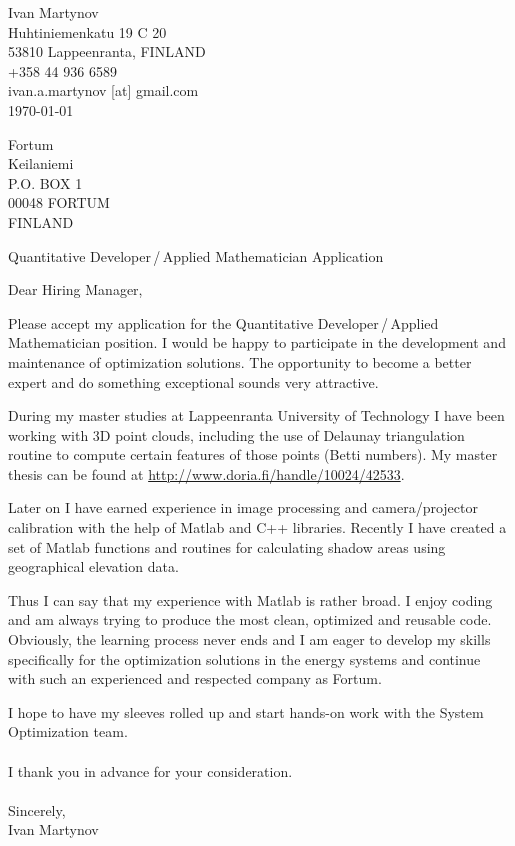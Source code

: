 \documentclass[]{article}
\begin{document}
\begin{flushright}
	Ivan Martynov\\
  Huhtiniemenkatu 19 C 20\\
	53810 Lappeenranta, FINLAND\\
	+358 44 936 6589\\
	ivan.a.martynov [at] gmail.com\\
	\today
\end{flushright}

\begin{flushleft}
  Fortum\\
  Keilaniemi\\
  P.O. BOX 1\\
  00048 FORTUM\\
  FINLAND
\end{flushleft}

\begin{center}
  Quantitative Developer\,/\,Applied Mathematician Application
\end{center}

\noindent
Dear Hiring Manager,
\bigskip

\noindent
Please accept my application for the Quantitative Developer\,/\,Applied
Mathematician position. I would be happy to participate in the development and
maintenance of optimization solutions. The opportunity to become a better expert
and do something exceptional sounds very attractive.

\medskip
\noindent
During my master studies at Lappeenranta University of Technology I have been
working with 3D point clouds, including the use of Delaunay triangulation
routine to compute certain features of those points (Betti numbers). My master
thesis can be found at \href{http://www.doria.fi/handle/10024/42533}
{http://www.doria.fi/handle/10024/42533}.

\medskip
\noindent
Later on I have earned experience in image processing and camera/projector
calibration with the help of Matlab and C++ libraries. Recently I have created a
set of Matlab functions and routines for calculating shadow areas using
geographical elevation data.

\medskip
\noindent
Thus I can say that my experience with Matlab is rather broad. I enjoy coding
and am always trying to produce the most clean, optimized and reusable code.
Obviously, the learning process never ends and I am eager to develop my skills
specifically for the optimization solutions in the energy systems and continue
with such an experienced and respected company as Fortum.

\medskip
\noindent
I hope to have my sleeves rolled up and start hands-on work with the System
Optimization team.
\\\ \\

\noindent
I thank you in advance for your consideration.\\\ \\

\noindent Sincerely,\\
Ivan Martynov
\end{document}
